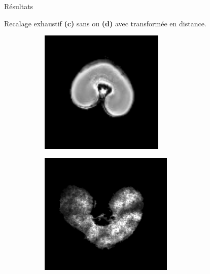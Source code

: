 \documentclass[10pt]{beamer}
\begin{document}
\begin{frame}{Résultats}

  Recalage exhaustif \textbf{(c)} sans ou \textbf{(d)} avec transformée en distance.
  \begin{figure}[ht]
    \centering
    \begin{subfigure}[t]{0.33\textwidth}
      \centering
      \includegraphics[width=0.65\textwidth]{fig/mri_slice6}
      \caption{}
      \label{subfig:mri_slice6}
    \end{subfigure}%
    \begin{subfigure}[t]{0.33\textwidth}
      \centering
      \includegraphics[width=0.7\textwidth]{fig/maldi_slice6}
      \caption{}
      \label{subfig:maldi_slice6}
    \end{subfigure}%
    \begin{subfigure}[t]{0.33\textwidth}
      \centering

\end{subfigure}
\end{figure}
\end{frame}
\end{document}
